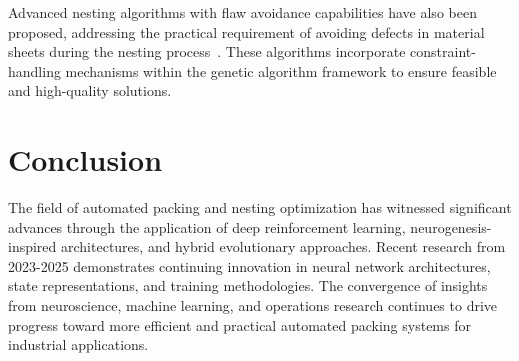 \documentclass[12pt]{article}
\begin{document}
Advanced nesting algorithms with flaw avoidance capabilities have also been proposed, addressing the practical requirement of avoiding defects in material sheets during the nesting process~\cite{irregular_flaw2024}. These algorithms incorporate constraint-handling mechanisms within the genetic algorithm framework to ensure feasible and high-quality solutions.

\section{Conclusion}

The field of automated packing and nesting optimization has witnessed significant advances through the application of deep reinforcement learning, neurogenesis-inspired architectures, and hybrid evolutionary approaches. Recent research from 2023-2025 demonstrates continuing innovation in neural network architectures, state representations, and training methodologies. The convergence of insights from neuroscience, machine learning, and operations research continues to drive progress toward more efficient and practical automated packing systems for industrial applications.



\end{document}
